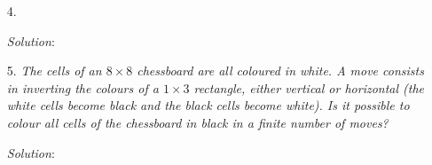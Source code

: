 \documentclass{article}
\begin{document}
\begin{enumerate}[1.]
\item[4.] %
\textit{}

\textit{Solution}:


\item[5.] %
\textit{The cells of an $8 \times 8$ chessboard are all coloured in white. A move consists in inverting the colours of a $1 \times 3$ rectangle, either vertical or horizontal (the white cells become black and the black cells become white).
Is it possible to colour all cells of the chessboard in black in a finite number of moves?}

\textit{Solution}: 


\end{enumerate}
\end{document}
